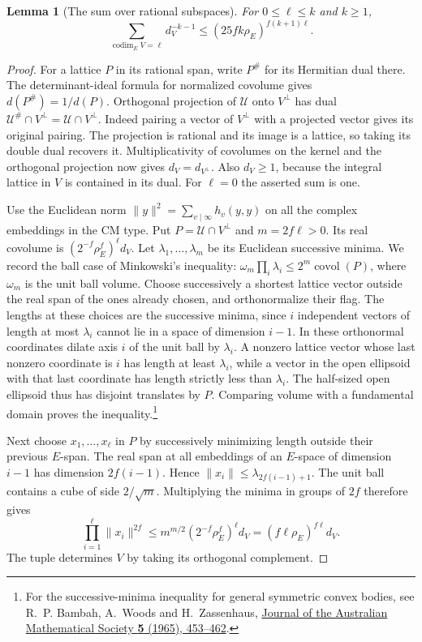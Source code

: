 \documentclass[a4paper,11pt]{article}
\newtheorem{lemma}[proposition]{Lemma}
\theoremstyle{definition}
\theoremstyle{remark}
\numberwithin{equation}{section}
\begin{document}
\begin{lemma}[The sum over rational subspaces]\leavevmode
\label{lem:spacezeta690}
For \(0\le \ell\le k\) and \(k\ge1\),
\[
 \sum_{\operatorname{codim}_E V=\ell}d_V^{-k-1}
             \le (25 f k\rho_E)^{f(k+1)\ell}.
\]
\end{lemma}
\begin{proof}
For a lattice \(P\) in its rational span, write \(P^\#\) for
its Hermitian dual there. The determinant-ideal formula for
normalized covolume gives \(d(P^\#)=1/d(P)\).
Orthogonal projection of \(\mathcal U\) onto \(V^\perp\)
has dual \(\mathcal U^\#\cap V^\perp=\mathcal U\cap V^\perp\).
Indeed pairing a vector of \(V^\perp\) with a projected
vector gives its original pairing. The projection is rational
and its image is a lattice, so taking its double dual
recovers it. Multiplicativity of covolumes on the kernel
and the orthogonal projection now gives \(d_V=d_{V^\perp}\).
Also \(d_V\ge1\), because the integral lattice in \(V\) is
contained in its dual. For \(\ell=0\) the asserted sum is one.

Use the Euclidean norm
\(\|y\|^2=\sum_{v\mid\infty}h_v(y,y)\) on all the complex
embeddings in the CM type. Put \(P=\mathcal U\cap V^\perp\)
and \(m=2f\ell>0\). Its real covolume is
\((2^{-f}\rho_E^f)^\ell d_V\).
Let \(\lambda_1,\ldots,\lambda_m\) be its Euclidean successive
minima. We record the ball case of Minkowski's inequality:
\(\omega_m\prod_i\lambda_i\le2^m\operatorname{covol}(P)\),
where \(\omega_m\) is the unit ball volume. Choose successively
a shortest lattice vector outside the real span of the ones
already chosen, and orthonormalize their flag. The lengths
at these choices are the successive minima, since \(i\)
independent vectors of length at most \(\lambda_i\) cannot
lie in a space of dimension \(i-1\). In these orthonormal
coordinates dilate axis \(i\) of the unit ball by \(\lambda_i\).
A nonzero lattice vector whose last nonzero coordinate is \(i\)
has length at least \(\lambda_i\), while a vector in the open
ellipsoid with that last coordinate has length strictly less
than \(\lambda_i\). The half-sized open ellipsoid thus has
disjoint translates by \(P\). Comparing volume with a
fundamental domain proves the inequality.\footnote{For
the successive-minima inequality for general symmetric
convex bodies, see R.~P. Bambah, A.~Woods and H.~Zassenhaus,
\href{https://doi.org/10.1017/S1446788700028482}{Journal of the
Australian Mathematical Society \textbf{5} (1965), 453--462}.}

Next choose \(x_1,\ldots,x_\ell\) in \(P\) by successively
minimizing length outside their previous \(E\)-span. The
real span at all embeddings of an \(E\)-space of dimension
\(i-1\) has dimension \(2f(i-1)\). Hence
\(\|x_i\|\le\lambda_{2f(i-1)+1}\). The unit ball contains a
cube of side \(2/\sqrt m\). Multiplying the minima in groups
of \(2f\) therefore gives
\[
          \prod_{i=1}^{\ell}\|x_i\|^{2f}
             \le m^{m/2}(2^{-f}\rho_E^f)^\ell d_V
             =(f\ell\rho_E)^{f\ell}d_V .
\]
The tuple determines \(V\) by taking its orthogonal complement.


\end{proof}
\end{document}
